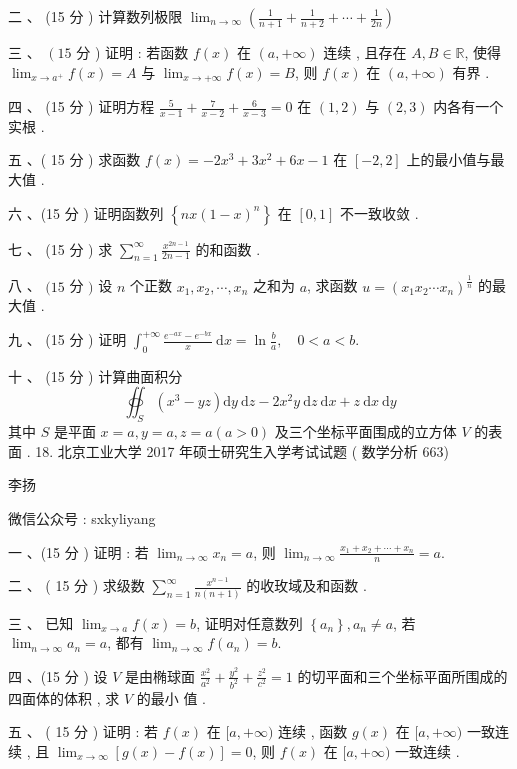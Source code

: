 \documentclass[10pt]{article}
\begin{document}
{ 二 、 (15  分 )  计算数列极限  $\lim _{n \rightarrow \infty}\left(\frac{1}{n+1}+\frac{1}{n+2}+\cdots+\frac{1}{2 n}\right)$

 三 、 $\left(15\right.$  分 )  证明 :  若函数  $f(x)$  在  $(a,+\infty)$  连续 ,  且存在  $A, B \in \mathbb{R}$,  使得  $\lim _{x \rightarrow a^{+}} f(x)=A$  与  $\lim _{x \rightarrow+\infty} f(x)=B$,  则  $f(x)$  在  $(a,+\infty)$  有界 .

 四 、 (15  分 )  证明方程  $\frac{5}{x-1}+\frac{7}{x-2}+\frac{6}{x-3}=0$  在  $(1,2)$  与  $(2,3)$  内各有一个实根 .

 五 、( 15  分 )  求函数  $f(x)=-2 x^{3}+3 x^{2}+6 x-1$  在  $[-2,2]$  上的最小值与最大值 .

 六 、(15  分 )  证明函数列  $\left\{n x(1-x)^{n}\right\}$  在  $[0,1]$  不一致收敛 .

 七 、 (15  分 )  求  $\sum_{n=1}^{\infty} \frac{x^{2 n-1}}{2 n-1}$  的和函数 .

 八 、 $(15$  分  $)$  设  $n$  个正数  $x_{1}, x_{2}, \cdots, x_{n}$  之和为  $a$,  求函数  $u=\left(x_{1} x_{2} \cdots x_{n}\right)^{\frac{1}{n}}$  的最大值 .

 九 、 (15  分 )  证明  $\int_{0}^{+\infty} \frac{e^{-a x}-e^{-b x}}{x} \mathrm{~d} x=\ln \frac{b}{a}, \quad 0<a<b$.

 十 、 (15  分 )  计算曲面积分 
$$
\oiint_{S}\left(x^{3}-y z\right) \mathrm{d} y \mathrm{~d} z-2 x^{2} y \mathrm{~d} z \mathrm{~d} x+z \mathrm{~d} x \mathrm{~d} y
$$
 其中  $S$  是平面  $x=a, y=a, z=a(a>0)$  及三个坐标平面围成的立方体  $V$  的表面 . 18.  北京工业大学  2017  年硕士研究生入学考试试题 ( 数学分析 663)

 李扬 

 微信公众号 : sxkyliyang

 一 、(15  分 )  证明 :  若  $\lim _{n \rightarrow \infty} x_{n}=a$,  则  $\lim _{n \rightarrow \infty} \frac{x_{1}+x_{2}+\cdots+x_{n}}{n}=a$.

 二 、 ( 15  分 )  求级数  $\sum_{n=1}^{\infty} \frac{x^{n-1}}{n(n+1)}$  的收玫域及和函数 .

 三 、 已知  $\lim _{x \rightarrow a} f(x)=b$,  证明对任意数列  $\left\{a_{n}\right\}, a_{n} \neq a$,  若  $\lim _{n \rightarrow \infty} a_{n}=a$,  都有  $\lim _{n \rightarrow \infty} f\left(a_{n}\right)=b$.

 四 、(15  分 )  设  $V$  是由椭球面  $\frac{x^{2}}{a^{2}}+\frac{y^{2}}{b^{2}}+\frac{z^{2}}{c^{2}}=1$  的切平面和三个坐标平面所围成的四面体的体积 ,  求  $V$  的最小   值 .

 五 、 ( 15  分 )  证明 :  若  $f(x)$  在  $[a,+\infty)$  连续 ,  函数  $g(x)$  在  $[a,+\infty)$  一致连续 ,  且  $\lim _{x \rightarrow \infty}[g(x)-f(x)]=0$,  则  $f(x)$  在  $[a,+\infty)$  一致连续 .

}
\end{document}

